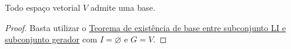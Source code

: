 \begin{theorem}
	Todo espaço vetorial $V$ admite uma base.
\end{theorem}
\begin{proof}
	Basta utilizar o \href{http://mtm.ufsc.br/~cordeiro/ensino/mtm3112.algebra.linear/06.bases/teo_base_entre_li_e_gerador_moodle.html}{Teorema de existência de base entre subconjunto LI e subconjunto gerador} com $I=\varnothing$ e $G=V$.
\end{proof}
